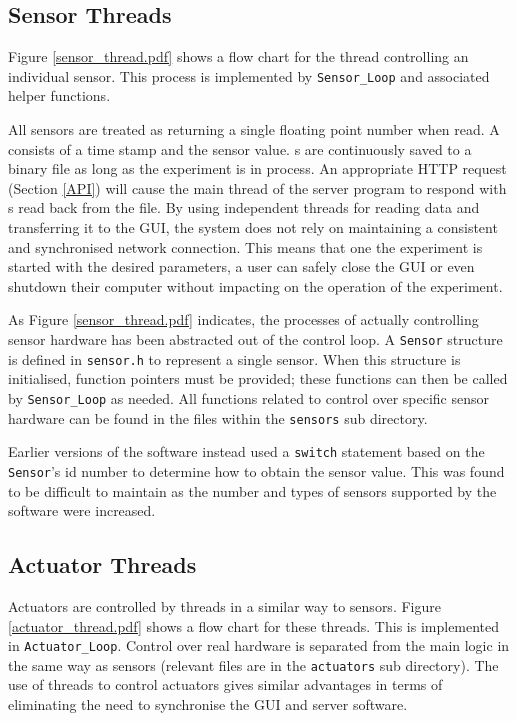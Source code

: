 \subsection{Sensor Threads}\label{Sensor Thread}

Figure \ref{sensor_thread.pdf} shows a flow chart for the thread controlling an individual sensor. This process is implemented by \verb/Sensor_Loop/ and associated helper functions.

All sensors are treated as returning a single floating point number when read. A  consists of a time stamp and the sensor value. s are continuously saved to a binary file as long as the experiment is in process. An appropriate HTTP request (Section \ref{API}) will cause the main thread of the server program to respond with s read back from the file. By using independent threads for reading data and transferring it to the GUI, the system does not rely on maintaining a consistent and synchronised network connection. This means that one the experiment is started with the desired parameters, a user can safely close the GUI or even shutdown their computer without impacting on the operation of the experiment.



As Figure \ref{sensor_thread.pdf} indicates, the processes of actually controlling sensor hardware has been abstracted out of the control loop. A \verb/Sensor/ structure is defined in \verb/sensor.h/ to represent a single sensor. When this structure is initialised, function pointers must be provided; these functions can then be called by \verb/Sensor_Loop/ as needed. All functions related to control over specific sensor hardware can be found in the files within the \verb/sensors/ sub directory.

Earlier versions of the software instead used a \verb/switch/ statement based on the \verb/Sensor/'s id number to determine how to obtain the sensor value. This was found to be difficult to maintain as the number and types of sensors supported by the software were increased.



\subsection{Actuator Threads}\label{Actuator Thread}

Actuators are controlled by threads in a similar way to sensors. Figure \ref{actuator_thread.pdf} shows a flow chart for these threads. This is implemented in \verb/Actuator_Loop/. Control over real hardware is separated from the main logic in the same way as sensors (relevant files are in the \verb/actuators/ sub directory). The use of threads to control actuators gives similar advantages in terms of eliminating the need to synchronise the GUI and server software.

